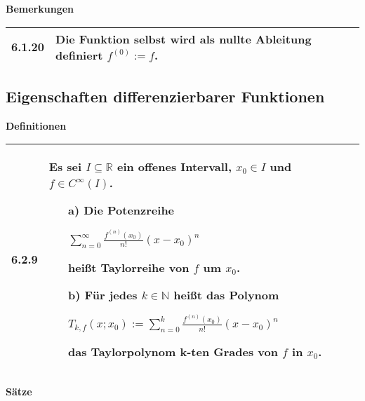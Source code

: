     \noindent
    \textbf{Bemerkungen}
    
    \begin{longtable}{p{1cm} p{16cm}}
        \toprule

        6.1.20& Die Funktion selbst wird als nullte Ableitung definiert $f^{(0)} := f$. \\

        \bottomrule
    \end{longtable}
    


    

\subsection{Eigenschaften differenzierbarer Funktionen}
    \noindent
    \textbf{Definitionen}
      
    \begin{longtable}{p{1cm} p{16cm}}
        \toprule

        6.2.9 & Es sei $I \subseteq \mathbb{R}$ ein offenes Intervall, $x_0 \in I$ und $f \in C^{\infty}(I)$.
                \begin{itemize}[topsep=-0.5cm]
                    \item[a)] Die Potenzreihe \hfill \break
                                \centerline{$\sum^{\infty}_{n=0} \frac{f^{(n)}(x_0)}{n!}(x-x_0)^n$}
                                heißt \textbf{Taylorreihe} von $f$ um $x_0$.
                    \item[b)] Für jedes $k \in \mathbb{N}$ heißt das Polynom \hfill \break
                                \centerline{$T_{k,f}(x;x_0) := \sum^{k}_{n=0} \frac{f^{(n)}(x_0)}{n!}(x-x_0)^n$}
                                das \textbf{Taylorpolynom k-ten Grades} von $f$ in $x_0$.
                \end{itemize} \vspace{-0cm}  \\

        \bottomrule

    \end{longtable}
    

    \noindent 
    \textbf{Sätze}
    
